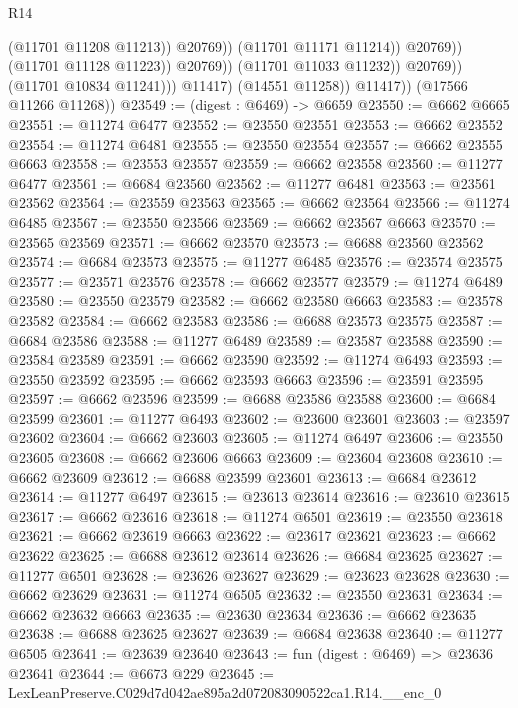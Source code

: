 \begin{lexlean}{R14}
\begin{coremodule}
                                          (@11701 @11208 @11213))
                                        @20769))
                                    (@11701 @11171 @11214))
                                  @20769))
                              (@11701 @11128 @11223))
                            @20769))
                        (@11701 @11033 @11232))
                      @20769))
                  (@11701 @10834 @11241)))
              @11417)
            (@14551 @11258))
          @11417))
      (@17566 @11266 @11268))
@23549 := (digest : @6469) -> @6659
@23550 := @6662 @6665
@23551 := @11274 @6477
@23552 := @23550 @23551
@23553 := @6662 @23552
@23554 := @11274 @6481
@23555 := @23550 @23554
@23557 := @6662 @23555 @6663
@23558 := @23553 @23557
@23559 := @6662 @23558
@23560 := @11277 @6477
@23561 := @6684 @23560
@23562 := @11277 @6481
@23563 := @23561 @23562
@23564 := @23559 @23563
@23565 := @6662 @23564
@23566 := @11274 @6485
@23567 := @23550 @23566
@23569 := @6662 @23567 @6663
@23570 := @23565 @23569
@23571 := @6662 @23570
@23573 := @6688 @23560 @23562
@23574 := @6684 @23573
@23575 := @11277 @6485
@23576 := @23574 @23575
@23577 := @23571 @23576
@23578 := @6662 @23577
@23579 := @11274 @6489
@23580 := @23550 @23579
@23582 := @6662 @23580 @6663
@23583 := @23578 @23582
@23584 := @6662 @23583
@23586 := @6688 @23573 @23575
@23587 := @6684 @23586
@23588 := @11277 @6489
@23589 := @23587 @23588
@23590 := @23584 @23589
@23591 := @6662 @23590
@23592 := @11274 @6493
@23593 := @23550 @23592
@23595 := @6662 @23593 @6663
@23596 := @23591 @23595
@23597 := @6662 @23596
@23599 := @6688 @23586 @23588
@23600 := @6684 @23599
@23601 := @11277 @6493
@23602 := @23600 @23601
@23603 := @23597 @23602
@23604 := @6662 @23603
@23605 := @11274 @6497
@23606 := @23550 @23605
@23608 := @6662 @23606 @6663
@23609 := @23604 @23608
@23610 := @6662 @23609
@23612 := @6688 @23599 @23601
@23613 := @6684 @23612
@23614 := @11277 @6497
@23615 := @23613 @23614
@23616 := @23610 @23615
@23617 := @6662 @23616
@23618 := @11274 @6501
@23619 := @23550 @23618
@23621 := @6662 @23619 @6663
@23622 := @23617 @23621
@23623 := @6662 @23622
@23625 := @6688 @23612 @23614
@23626 := @6684 @23625
@23627 := @11277 @6501
@23628 := @23626 @23627
@23629 := @23623 @23628
@23630 := @6662 @23629
@23631 := @11274 @6505
@23632 := @23550 @23631
@23634 := @6662 @23632 @6663
@23635 := @23630 @23634
@23636 := @6662 @23635
@23638 := @6688 @23625 @23627
@23639 := @6684 @23638
@23640 := @11277 @6505
@23641 := @23639 @23640
@23643 := fun (digest : @6469) => @23636 @23641
@23644 := @6673 @229
@23645 := LexLeanPreserve.C029d7d042ae895a2d072083090522ca1.R14.__enc_0

\end{coremodule}
\end{lexlean}
